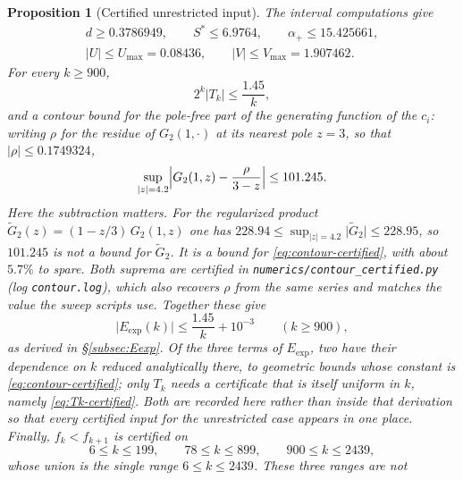 \documentclass[11pt]{amsart}
\theoremstyle{plain}
\newtheorem{proposition}[theorem]{Proposition}
\theoremstyle{definition}
\newcommand{\abs}[1]{\lvert #1\rvert}
\begin{document}
\begin{proposition}[Certified unrestricted input]\label{prop:full-certified}
The interval computations give
\begin{equation}\label{eq:full-certified-constants}
 \begin{gathered}
  d\geq0.3786949,\qquad
  S^*\leq6.9764,
  \qquad \alpha_+\leq15.425661,\\
  \abs U\leq U_{\max}=0.08436,
  \qquad
  \abs V\leq V_{\max}=1.907462.
 \end{gathered}
\end{equation}
For every $k\geq900$,
\begin{equation}\label{eq:Tk-certified}
 2^k\abs{T_k}\leq\frac{1.45}{k},
\end{equation}
and a contour bound for the \emph{pole-free part} of the generating function
of the $c_i$: writing $\rho$ for the residue of $G_2(1,\cdot)$ at its nearest
pole $z=3$, so that $\abs\rho\leq0.1749324$,
\begin{equation}\label{eq:contour-certified}
 \sup_{\abs z=4.2}\Bigl\lvert G_2(1,z)-\frac{\rho}{3-z}\Bigr\rvert\leq101.245 .
\end{equation}
Here the subtraction matters. For the regularized product
$\widetilde G_2(z)=(1-z/3)\,G_2(1,z)$ one has
$228.94\leq\sup_{\abs z=4.2}\abs{\widetilde G_2}\leq228.95$, so $101.245$ is
not a bound for $\widetilde G_2$. It is a bound for
\eqref{eq:contour-certified}, with about $5.7\%$ to spare. Both suprema are
certified in \texttt{numerics/contour\_certified.py} (log
\texttt{contour.log}), which also recovers $\rho$ from the same series and
matches the value the sweep scripts use.
Together these give
\begin{equation}\label{eq:Eexp-certified}
 \abs{E_{\exp}(k)}\leq\frac{1.45}{k}+10^{-3}
 \qquad(k\geq900),
\end{equation}
as derived in \S\ref{subsec:Eexp}. Of the three terms of $E_{\exp}$, two have
their dependence on $k$ reduced analytically there, to geometric bounds whose
constant is \eqref{eq:contour-certified}; only $T_k$ needs a certificate that
is itself uniform in $k$, namely \eqref{eq:Tk-certified}. Both are recorded
here rather than inside that derivation so that every certified input for the
unrestricted case appears in one place.
Finally, $f_k<f_{k+1}$ is certified on
\begin{equation}\label{eq:full-sweep-ranges}
  6\leq k\leq199,
  \qquad 78\leq k\leq899,
  \qquad 900\leq k\leq2439,
\end{equation}
whose union is the single range $6\leq k\leq2439$. These three ranges are not

\end{proposition}
\end{document}
